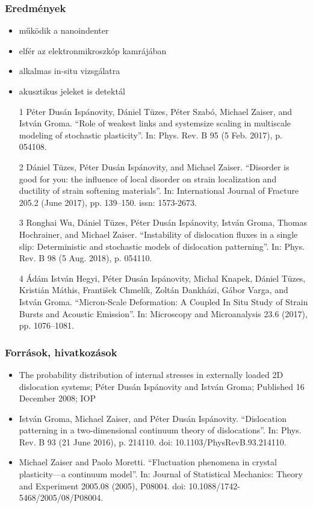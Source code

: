 \documentclass[12pt]{beamer}
\begin{document}
\begin{frame}
\frametitle{Eredmények}
\begin{itemize}
\item működik a nanoindenter
\item elfér az elektronmikroszkóp kamrájában
\item alkalmas in-situ vizsgálatra
\item akusztikus jeleket is detektál
\end{itemize}
\end{frame}

\begin{frame}
\footnotesize
\begin{itemize}
\item[1] Péter Dusán Ispánovity, Dániel Tüzes, Péter Szabó, Michael
Zaiser, and István Groma. “Role of weakest links and systemsize
scaling in multiscale modeling of stochastic plasticity”.
In: Phys. Rev. B 95 (5 Feb. 2017), p. 054108.
\item[2] Dániel Tüzes, Péter Dusán Ispánovity, and Michael Zaiser.
“Disorder is good for you: the influence of local disorder on
strain localization and ductility of strain softening materials”.
In: International Journal of Fracture 205.2 (June 2017),
pp. 139–150. issn: 1573-2673.
\item[3] Ronghai Wu, Dániel Tüzes, Péter Dusán Ispánovity, István
Groma, Thomas Hochrainer, and Michael Zaiser. “Instability
of dislocation fluxes in a single slip: Deterministic and stochastic
models of dislocation patterning”. In: Phys. Rev. B 98 (5
Aug. 2018), p. 054110.
\item[4] Ádám István Hegyi, Péter Dusán Ispánovity, Michal Knapek,
Dániel Tüzes, Kristián Máthis, František Chmelík, Zoltán Dankházi,
Gábor Varga, and István Groma. “Micron-Scale Deformation:
A Coupled In Situ Study of Strain Bursts and Acoustic
Emission”. In: Microscopy and Microanalysis 23.6 (2017),
pp. 1076–1081.
\end{itemize}
\end{frame}

\begin{frame}
\frametitle{Források, hivatkozások}
\begin{itemize}
\item
The probability distribution of internal stresses in externally loaded 2D dislocation systems; Péter Dusán Ispánovity and István Groma; Published 16 December 2008; IOP
\item
István Groma, Michael Zaiser, and Péter Dusán Ispánovity.
“Dislocation patterning in a two-dimensional continuum theory
of dislocations”. In: Phys. Rev. B 93 (21 June 2016),
p. 214110. doi: 10.1103/PhysRevB.93.214110.
\item
Michael Zaiser and Paolo Moretti. “Fluctuation phenomena
in crystal plasticity—a continuum model”. In: Journal of Statistical
Mechanics: Theory and Experiment 2005.08 (2005),
P08004. doi: 10.1088/1742-5468/2005/08/P08004.
\end{itemize}

\end{frame}
\end{document}
